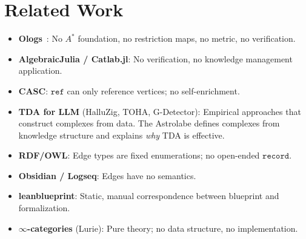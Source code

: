 \section{Related Work}
\label{sec:related}

\begin{itemize}
\item \textbf{Ologs}~\cite{Spivak2012}: No $A^*$ foundation, no restriction maps, no metric, no verification.
\item \textbf{AlgebraicJulia / Catlab.jl}: No verification, no knowledge management application.
\item \textbf{CASC}: $\texttt{ref}$ can only reference vertices; no self-enrichment.
\item \textbf{TDA for LLM} (HalluZig, TOHA, G-Detector): Empirical approaches that construct complexes from data. The Astrolabe defines complexes from knowledge structure and explains \emph{why} TDA is effective.
\item \textbf{RDF/OWL}: Edge types are fixed enumerations; no open-ended $\texttt{record}$.
\item \textbf{Obsidian / Logseq}: Edges have no semantics.
\item \textbf{leanblueprint}: Static, manual correspondence between blueprint and formalization.
\item \textbf{$\infty$-categories} (Lurie): Pure theory; no data structure, no implementation.
\end{itemize}
